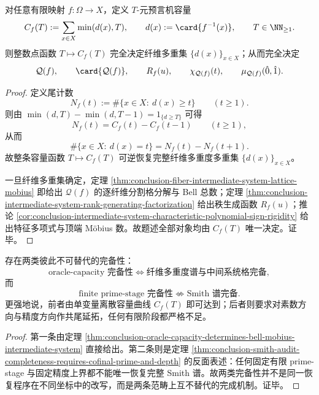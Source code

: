 \begin{theorem}\label{thm:conclusion-oracle-capacity-determines-bell-mobius-intermediate-system}
对任意有限映射 \(f:\Omega\to X\)，定义 \(T\)-元预言机容量
\[
C_f(T):=\sum_{x\in X}\min(d(x),T),
\qquad
d(x):=\card{f^{-1}(x)},
\qquad
T\in\NN_{\ge 1}.
\]
则整数点函数 \(T\mapsto C_f(T)\) 完全决定纤维多重集 \(\{d(x)\}_{x\in X}\)；从而完全决定
\[
\mathcal Q(f),\qquad
\card{\mathcal Q(f)},\qquad
R_f(u),\qquad
\chi_{\mathcal Q(f)}(t),\qquad
\mu_{\mathcal Q(f)}(\hat0,\hat1).
\]
\end{theorem}
\begin{proof}
定义尾计数
\[
N_f(t):=\#\{x\in X:\ d(x)\ge t\}
\qquad (t\ge 1).
\]
则由 \(\min(d,T)-\min(d,T-1)=1_{\{d\ge T\}}\) 可得
\[
N_f(t)=C_f(t)-C_f(t-1)
\qquad (t\ge 1),
\]
从而
\[
\#\{x\in X:\ d(x)=t\}=N_f(t)-N_f(t+1).
\]
故整条容量函数 \(T\mapsto C_f(T)\) 可逆恢复完整纤维多重度多重集 \(\{d(x)\}_{x\in X}\)。

一旦纤维多重集确定，定理 \ref{thm:conclusion-fiber-intermediate-system-lattice-mobius} 即给出 \(\mathcal Q(f)\) 的逐纤维分割格分解与 Bell 总数；定理 \ref{thm:conclusion-intermediate-system-rank-generating-factorization} 给出秩生成函数 \(R_f(u)\)；推论 \ref{cor:conclusion-intermediate-system-characteristic-polynomial-sign-rigidity} 给出特征多项式与顶端 Möbius 数。故题述全部对象均由 \(C_f(T)\) 唯一决定。证毕。
\end{proof}

\begin{corollary}[容量完备性与素数视界完备性属于不同范畴]\label{cor:conclusion-capacity-completeness-vs-prime-stage-completeness-different-categories}
存在两类彼此不可替代的完备性：
\[
\text{oracle-capacity 完备性}
\Longleftrightarrow
\text{纤维多重度谱与中间系统格完备},
\]
而
\[
\text{finite prime-stage 完备性}
\not\Longleftrightarrow
\text{Smith 谱完备}.
\]
更强地说，前者由单变量离散容量曲线 \(C_f(T)\) 即可达到；后者则要求对素数方向与精度方向作共尾延拓，任何有限阶段都严格不足。
\end{corollary}
\begin{proof}
第一条由定理 \ref{thm:conclusion-oracle-capacity-determines-bell-mobius-intermediate-system} 直接给出。第二条则是定理 \ref{thm:conclusion-smith-audit-completeness-requires-cofinal-prime-and-depth} 的反面表述：任何固定有限 prime-stage 与固定精度上界都不能唯一恢复完整 Smith 谱。故两类完备性并不是同一恢复程序在不同坐标中的改写，而是两条范畴上互不替代的完成机制。证毕。
\end{proof}

